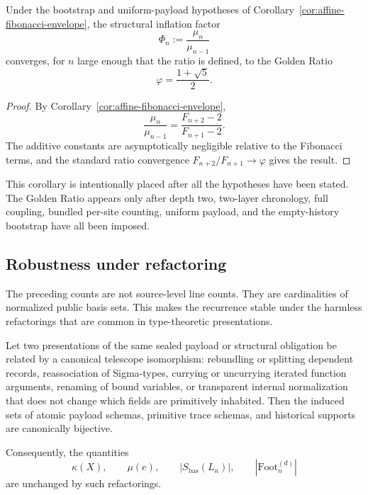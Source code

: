 \begin{corollary}
\label{cor:asymptotic-inflation-factor}
Under the bootstrap and uniform-payload hypotheses of
Corollary~\ref{cor:affine-fibonacci-envelope}, the structural inflation factor
\[
  \Phi_n := \frac{\mu_n}{\mu_{n-1}}
\]
converges, for \(n\) large enough that the ratio is defined, to the Golden Ratio
\[
  \varphi=\frac{1+\sqrt{5}}{2}.
\]
\end{corollary}

\begin{proof}
By Corollary~\ref{cor:affine-fibonacci-envelope},
\[
  \frac{\mu_n}{\mu_{n-1}}
  =
  \frac{F_{n+2}-2}{F_{n+1}-2}.
\]
The additive constants are asymptotically negligible relative to the Fibonacci terms, and the
standard ratio convergence \(F_{n+2}/F_{n+1}\to\varphi\) gives the result.
\end{proof}

This corollary is intentionally placed after all the hypotheses have been stated.  The Golden
Ratio appears only after depth two, two-layer chronology, full coupling, bundled per-site
counting, uniform payload, and the empty-history bootstrap have all been imposed.

\subsection{Robustness under refactoring}
\label{subsec:scaling-robustness}

The preceding counts are not source-level line counts.  They are cardinalities of normalized
public basis sets.  This makes the recurrence stable under the harmless refactorings that are
common in type-theoretic presentations.

\begin{corollary}
\label{cor:robustness-under-refactoring}
Let two presentations of the same sealed payload or structural obligation be related by a
canonical telescope isomorphism: rebundling or splitting dependent records, reassociation of
Sigma-types, currying or uncurrying iterated function arguments, renaming of bound variables,
or transparent internal normalization that does not change which fields are primitively
inhabited.  Then the induced sets of atomic payload schemas, primitive trace schemas, and
historical supports are canonically bijective.

Consequently, the quantities
\[
  \kappa(X),
  \qquad
  \mu(e),
  \qquad
  |S_{\mathrm{bas}}(L_n)|,
  \qquad
  |\mathrm{Foot}^{(d)}_n|
\]
are unchanged by such refactorings.
\end{corollary}

